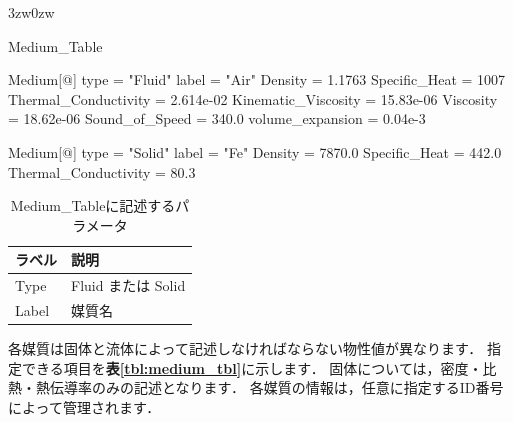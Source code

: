 \begin{indentation}{3zw}{0zw}

{\small
\begin{program}
Medium_Table {

  Medium[@] {
    type                 = "Fluid"
    label                = "Air"
    Density              = 1.1763
    Specific_Heat        = 1007
    Thermal_Conductivity = 2.614e-02
    Kinematic_Viscosity  = 15.83e-06
    Viscosity            = 18.62e-06
    Sound_of_Speed       = 340.0
    volume_expansion     = 0.04e-3 
  }

  Medium[@] {
    type                 = "Solid"
    label                = "Fe"
    Density              = 7870.0
    Specific_Heat        = 442.0
    Thermal_Conductivity = 80.3
  }

}
\end{program}
}

\begin{table}[htdp]
\caption{Medium\_Tableに記述するパラメータ}
\begin{center}
\begin{tabular}{ll} \toprule
ラベル & 説明\\ \midrule
Type & Fluid または Solid\\
Label & 媒質名\\ \bottomrule
\end{tabular}
\end{center}
\label{tbl:MTLentry}
\end{table}


各媒質は固体と流体によって記述しなければならない物性値が異なります．
指定できる項目を\textbf{表\ref{tbl:medium_tbl}}に示します．
固体については，密度・比熱・熱伝導率のみの記述となります．
各媒質の情報は，任意に指定するID番号によって管理されます．


\end{indentation}

